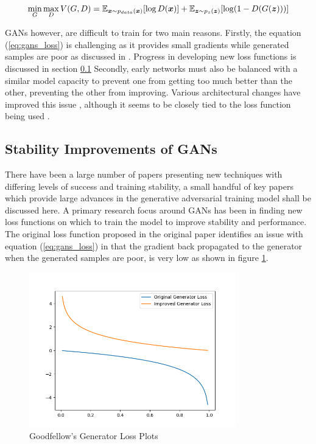 \begin{equation} \label{eq:gans_loss}
    \min_{G} \max_{D} V(G, D) = \mathbb{E}_{{\boldsymbol{{x}}} \sim p_{data}({\boldsymbol{{x}}})} [\log D({\boldsymbol{{x}}})]
                              + \mathbb{E}_{{\boldsymbol{{z}}} \sim p_{z}({\boldsymbol{{z}}})} [\log (1 - D(G({\boldsymbol{{z}}})))]
\end{equation}
\quad

GANs however, are difficult to train for two main reasons.
Firstly, the equation (\ref{eq:gans_loss}) is challenging as it provides small gradients while generated samples are poor as discussed in \cite{Goodfellow2014}.
Progress in developing new loss functions is discussed in section \ref{Stability_to_GANs}
Secondly, early networks must also be balanced with a similar model capacity to prevent one from getting too much better than the other, preventing the other from improving.
Various architectural changes have improved this issue \cite{Radford2016, Zhang2018}, although it seems to be closely tied to the loss function being used \cite{Gulrajani2017}.

\subsection{Stability Improvements of GANs} \label{Stability_to_GANs}
There have been a large number of papers presenting new techniques with differing levels of success and training stability, a small handful of key papers which provide large advances in the generative adversarial training model shall be discussed here.
A primary research focus around GANs has been in finding new loss functions on which to train the model to improve stability and performance.
The original loss function proposed in the original paper \cite{Goodfellow2014} identifies an issue with equation (\ref{eq:gans_loss}) in that the gradient back propagated to the generator when the generated samples are poor, is very low as shown in figure \ref{fig:Goodfellow_plot}.

\begin{figure}[h]
    \centering
        \includegraphics[width=0.8\textwidth]{figures/dl/goodfellow_gen_losses.png}
    \caption{Goodfellow's Generator Loss Plots \cite{Goodfellow2014}}\label{fig:Goodfellow_plot}
\end{figure}
\quad

